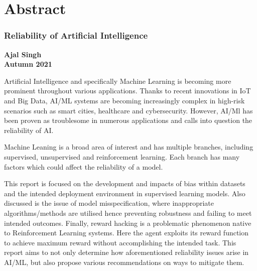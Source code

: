 \thispagestyle{plain}
\pagebreak
\chapter*{Abstract}
\subsection*{\hfill Reliability of Artificial Intelligence \hfill}
\textbf{Ajal Singh}\\
\textbf{Autumn 2021}

Artificial Intelligence and specifically Machine Learning is becoming more prominent 
throughout various applications. Thanks to recent innovations in IoT and Big Data, AI/ML systems
are becoming increasingly complex in high-risk scenarios such as smart cities, healthcare and cybersecurity.
However, AI/Ml has been proven as troublesome in numerous applications and calls into 
question the reliability of AI.
    
Machine Leaning is a broad area of interest and has multiple branches, including supervised, unsupervised and reinforcement learning.
Each branch has many factors which could affect the reliability of a model.

This report is focused on the development and impacts of bias within datasets and the intended deployment environment in supervised learning models.
Also discussed is the issue of model misspecification, where inappropriate algorithms/methods are utilised hence preventing
robustness and failing to meet intended outcomes. 
Finally, reward hacking is a problematic phenomenon native to Reinforcement Learning systems. 
Here the agent exploits its reward function to achieve maximum reward without accomplishing the intended task.
This report aims to not only determine how aforementioned reliability issues arise in AI/ML, but also propose
various recommendations on ways to mitigate them. 
